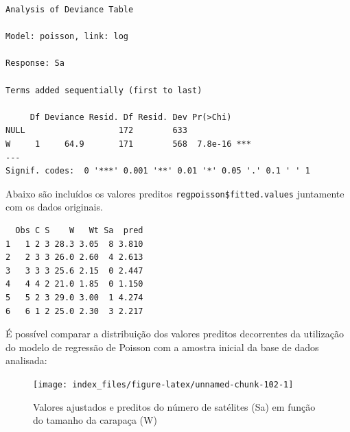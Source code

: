 \documentclass[12pt,brazil,oneside]{book}
\newenvironment{Shaded}{\begin{snugshade}}{\end{snugshade}}
\newcommand{\DataTypeTok}[1]{\textcolor[rgb]{0.13,0.29,0.53}{#1}}
\newcommand{\KeywordTok}[1]{\textcolor[rgb]{0.13,0.29,0.53}{\textbf{#1}}}
\newcommand{\NormalTok}[1]{#1}
\newcommand{\OperatorTok}[1]{\textcolor[rgb]{0.81,0.36,0.00}{\textbf{#1}}}
\newcommand{\StringTok}[1]{\textcolor[rgb]{0.31,0.60,0.02}{#1}}
\begin{document}
\begin{verbatim}
Analysis of Deviance Table

Model: poisson, link: log

Response: Sa

Terms added sequentially (first to last)

     Df Deviance Resid. Df Resid. Dev Pr(>Chi)    
NULL                   172        633             
W     1     64.9       171        568  7.8e-16 ***
---
Signif. codes:  0 '***' 0.001 '**' 0.01 '*' 0.05 '.' 0.1 ' ' 1
\end{verbatim}

Abaixo são incluídos os valores preditos \texttt{regpoisson\$fitted.values} juntamente com os dados originais.

\begin{Shaded}
\end{Shaded}

\begin{verbatim}
  Obs C S    W   Wt Sa  pred
1   1 2 3 28.3 3.05  8 3.810
2   2 3 3 26.0 2.60  4 2.613
3   3 3 3 25.6 2.15  0 2.447
4   4 4 2 21.0 1.85  0 1.150
5   5 2 3 29.0 3.00  1 4.274
6   6 1 2 25.0 2.30  3 2.217
\end{verbatim}

É possível comparar a distribuição dos valores preditos decorrentes da utilização do modelo de regressão de Poisson com a amostra inicial da base de dados analisada:

\begin{Shaded}
\end{Shaded}

\begin{figure}[H]

{\centering \texttt{[image: index\_files/figure-latex/unnamed-chunk-102-1]} 

}

\caption{Valores ajustados e preditos do número de satélites (Sa) em função do tamanho da carapaça (W)}\label{fig:unnamed-chunk-102}
\end{figure}
\end{document}

